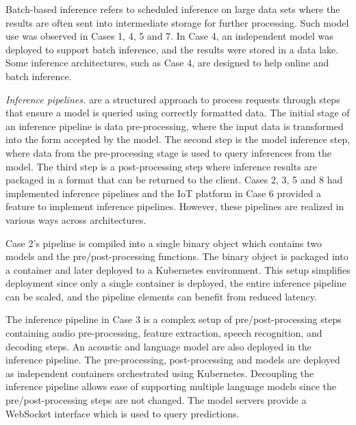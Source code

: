Batch-based inference refers to scheduled inference on large data sets where the results are often sent into intermediate storage for further processing. Such model use was observed in Cases 1, 4, 5 and 7. In Case 4, an independent model was deployed to support batch inference, and the results were stored in a data lake. Some inference architectures, such as Case 4, are designed to help online and batch inference.

\textit{Inference pipelines.} are a structured approach to process requests through steps that ensure a model is queried using correctly formatted data. The initial stage of an inference pipeline is data pre-processing, where the input data is transformed into the form accepted by the model. The second step is the model inference step, where data from the pre-processing stage is used to query inferences from the model. The third step is a post-processing step where inference results are packaged in a format that can be returned to the client. Cases 2, 3, 5 and 8 had implemented inference pipelines and the IoT platform in Case 6 provided a feature to implement inference pipelines. However, these pipelines are realized in various ways across architectures.

Case 2's pipeline is compiled into a single binary object which contains two models and the pre/post-processing functions. The binary object is packaged into a container and later deployed to a Kubernetes environment. This setup simplifies deployment since only a single container is deployed, the entire inference pipeline can be scaled, and the pipeline elements can benefit from reduced latency.

The inference pipeline in Case 3 is a complex setup of pre/post-processing steps containing audio pre-processing, feature extraction, speech recognition, and decoding steps. An acoustic and language model are also deployed in the inference pipeline. The pre-processing, post-processing and models are deployed as independent containers orchestrated using Kubernetes. Decoupling the inference pipeline allows ease of supporting multiple language models since the pre/post-processing steps are not changed. The model servers provide a WebSocket interface which is used to query predictions. %

